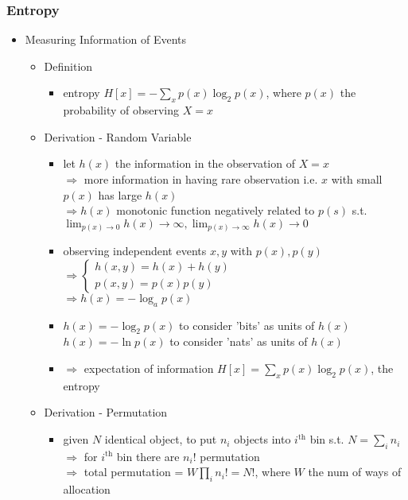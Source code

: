\subsubsection{Entropy}
\begin{itemize}
\item Measuring Information of Events
	\begin{itemize}
	\item Definition
		\begin{itemize}
		\item entropy $\displaystyle H[x]=-\sum_xp(x)\log_2p(x)$, where $p(x)$ the probability of observing $X=x$
		\end{itemize}
	\item Derivation - Random Variable
		\begin{itemize}
		\item let $h(x)$ the information in the observation of $X=x$ \\
		$\Rightarrow$ more information in having rare observation i.e. $x$ with small $p(x)$ has large $h(x)$ \\
		$\Rightarrow h(x)$ monotonic function negatively related to $p(s)$ s.t. $\lim_{p(x)\rightarrow0}h(x)\rightarrow\infty, \lim_{p(x)\rightarrow\infty}h(x)\rightarrow0$
		\item observing independent events $x,y$ with $p(x), p(y)$ \\
		$\Rightarrow \begin{cases} h(x, y) = h(x) + h(y) \\ p(x,y) = p(x)p(y)\end{cases}$ \\
		$\Rightarrow h(x) = -\log_a p(x)$
		\item $h(x)=-\log_2p(x)$ to consider 'bits' as units of $h(x)$ \\
		$h(x)=-\ln p(x)$ to consider 'nats' as units of $h(x)$
		\item $\Rightarrow$ expectation of information $H[x] = \sum_x p(x)\log_2p(x)$, the entropy
		\end{itemize}
	\item Derivation - Permutation
		\begin{itemize}
		\item given $N$ identical object, to put $n_i$ objects into $i^\text{th}$ bin s.t. $N=\sum_{i} n_i$ \\
		$\Rightarrow$ for $i^\text{th}$ bin there are $n_i!$ permutation \\
		$\Rightarrow$ total permutation = $W\prod_i n_i!=N!$, where $W$ the num of ways of allocation \\

\end{itemize}
\end{itemize}
\end{itemize}
